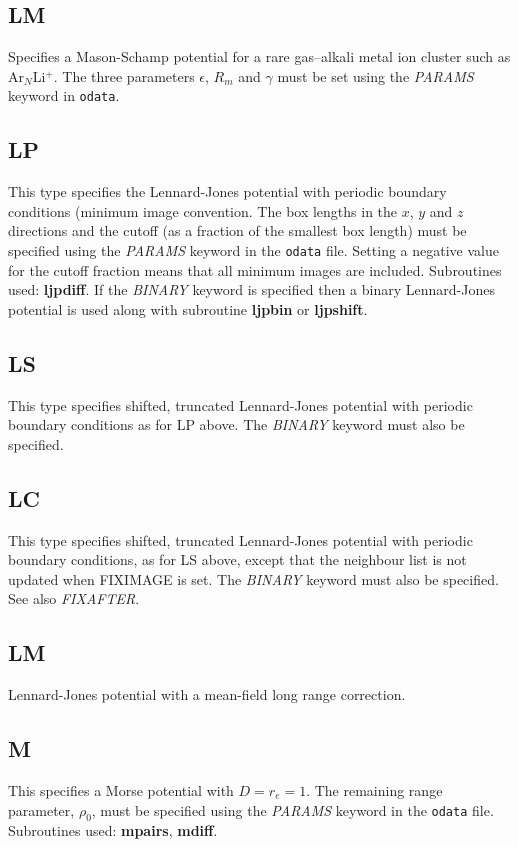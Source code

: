 \documentclass[12pt,a4paper,dvips]{article}
\begin{document}
\subsection{LM}Specifies a Mason-Schamp potential\cite{Mason58} for a rare gas--alkali metal ion cluster
such as Ar$_{N}$Li$^+$. The three parameters $\epsilon$, $R_m$ and $\gamma$
must be set using the {\it PARAMS\/} keyword in {\tt odata}.

\subsection{LP}This type specifies the Lennard-Jones potential with 
periodic boundary conditions (minimum image convention.\cite{allent87}
The box lengths in the $x$, $y$ and $z$ 
directions and the cutoff (as a fraction of the smallest box length)
must be specified using the {\it PARAMS\/} keyword in the {\tt odata} file.
Setting a negative value for the cutoff fraction means that all minimum
images are included.
Subroutines used: {\bf ljpdiff}.
If the {\it BINARY\/} keyword is specified then a binary Lennard-Jones
potential is used\cite{sastryds98} along with subroutine {\bf ljpbin} or {\bf ljpshift}.

\subsection{LS}This type specifies shifted, truncated Lennard-Jones potential with 
periodic boundary conditions as for LP above. The {\it BINARY\/} keyword must also be 
specified.

\subsection{LC}This type specifies shifted, truncated Lennard-Jones potential with 
periodic boundary conditions, as for LS above, except that the neighbour list is not
updated when FIXIMAGE is set. The {\it BINARY\/} keyword must also be 
specified. See also {\it FIXAFTER}.

\subsection{LM}Lennard-Jones potential with a mean-field long range correction.

\subsection{M}This specifies a Morse potential with $D=r_e=1$. 
The remaining range parameter,\cite{braierbw90} $\rho_0$, must be specified using the {\it PARAMS\/} keyword
in the {\tt odata} file.
Subroutines used: {\bf mpairs}, {\bf mdiff}.
\end{document}
